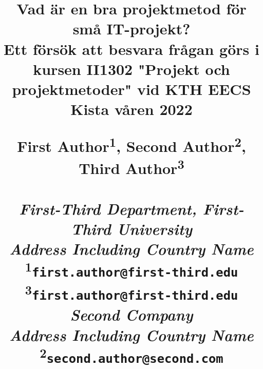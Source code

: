 \title{
    Vad är en bra projektmetod för små IT-projekt?\\
{\normalsize Ett försök att besvara frågan görs i kursen II1302 "Projekt och projektmetoder"
vid KTH EECS Kista våren 2022}

\begin{center}
    \large{ 
        First Author\textsuperscript{1}, Second Author\textsuperscript{2}, 
        Third Author\textsuperscript{3}\\
        \textit{\\First-Third Department, First-Third University\\
                Address Including Country Name\\}
        \textsuperscript{1}\texttt{first.author@first-third.edu}\\
        \textsuperscript{3}\texttt{first.author@first-third.edu}\\
        \textit{Second Company\\
        Address Including Country Name\\}
        \textsuperscript{2}\texttt{second.author@second.com}
    }
\end{center}
}

\author{}

\maketitle